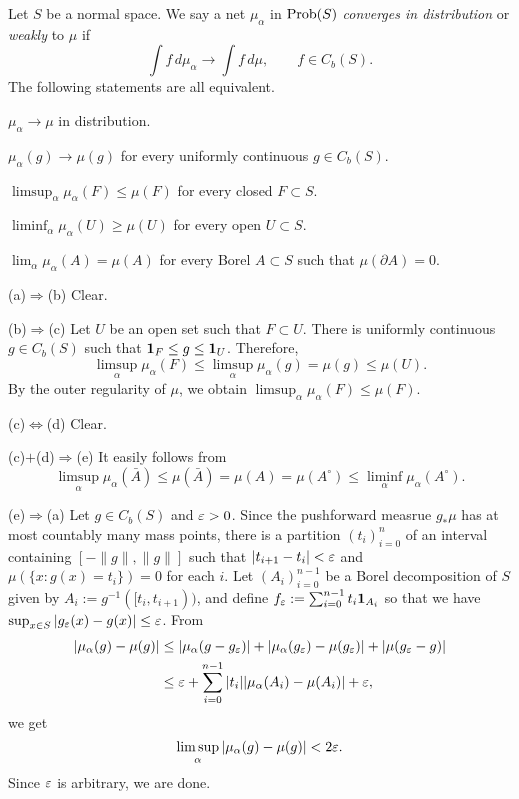 \documentclass{../../large}
\begin{document}




\begin{prb}
Let $S$ be a normal space.
We say a net $\mu_\alpha$ in $\operatorname{Prob}(S)$ \emph{converges in distribution} or \emph{weakly} to $\mu$ if
\[\int f\,d\mu_\alpha\to\int f\,d\mu,\qquad f\in C_b(S).\]
The following statements are all equivalent.
\begin{parts}
\item $\mu_\alpha\to\mu$ in distribution.
\item $\mu_\alpha(g)\to\mu(g)$ for every uniformly continuous $g\in C_b(S)$.
\item $\limsup_\alpha\mu_\alpha(F)\le\mu(F)$ for every closed $F\subset S$.
\item $\liminf_\alpha\mu_\alpha(U)\ge\mu(U)$ for every open $U\subset S$.
\item $\lim_\alpha\mu_\alpha(A)=\mu(A)$ for every Borel $A\subset S$ such that $\mu(\partial A)=0$.
\end{parts}
\end{prb}
\begin{pf}
(a)$\Rightarrow$(b)
Clear.

(b)$\Rightarrow$(c)
Let $U$ be an open set such that $F\subset U$.
There is uniformly continuous $g\in C_b(S)$ such that $\mathbf{1}_F\le g\le\mathbf{1}_U$.
Therefore,
\[\limsup_\alpha\mu_\alpha(F)\le\limsup_\alpha\mu_\alpha(g)=\mu(g)\le\mu(U).\]
By the outer regularity of $\mu$, we obtain $\limsup_\alpha\mu_\alpha(F)\le\mu(F)$.

(c)$\Leftrightarrow$(d)
Clear.

(c)$+$(d)$\Rightarrow$(e)
It easily follows from
\[\limsup_\alpha\mu_\alpha(\bar A)\le\mu(\bar A)=\mu(A)=\mu(A^\circ)\le\liminf_\alpha\mu_\alpha(A^\circ).\]

(e)$\Rightarrow$(a)
Let $g\in C_b(S)$ and $\varepsilon>0$.
Since the pushforward measrue $g_*\mu$ has at most countably many mass points, there is a partition $(t_i)_{i=0}^n$ of an interval containing $[-\|g\|,\|g\|]$ such that $|t_{i+1}-t_i|<\varepsilon$ and $\mu(\{x:g(x)=t_i\})=0$ for each $i$.
Let $(A_i)_{i=0}^{n-1}$ be a Borel decomposition of $S$ given by $A_i:=g^{-1}([t_i,t_{i+1}))$, and define $f_\varepsilon:=\sum_{i=0}^{n-1}t_i\mathbf{1}_{A_i}$ so that we have $\sup_{x\in S}|g_\varepsilon(x)-g(x)|\le\varepsilon$.
From
\begin{align*}
|\mu_\alpha(g)-\mu(g)|&\le|\mu_\alpha(g-g_\varepsilon)|+|\mu_\alpha(g_\varepsilon)-\mu(g_\varepsilon)|+|\mu(g_\varepsilon-g)|\\
&\le\varepsilon+\sum_{i=0}^{n-1}|t_i||\mu_\alpha(A_i)-\mu(A_i)|+\varepsilon,
\end{align*}
we get
\[\limsup_\alpha|\mu_\alpha(g)-\mu(g)|<2\varepsilon.\]
Since $\varepsilon$ is arbitrary, we are done.
\end{pf}
\end{document}
